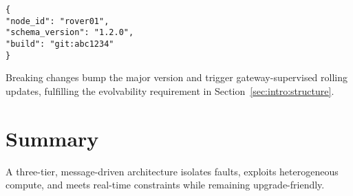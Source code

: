 \begin{verbatim}
{
"node_id": "rover01",
"schema_version": "1.2.0",
"build": "git:abc1234"
}
\end{verbatim}

Breaking changes bump the major version and trigger gateway-supervised
rolling updates, fulfilling the evolvability requirement in
Section~\ref{sec:intro:structure}.

\section{Summary}\label{sec:summary}
A three-tier, message-driven architecture isolates faults, exploits
heterogeneous compute, and meets real-time constraints while remaining
upgrade-friendly.